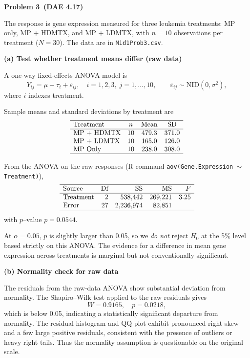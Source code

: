 \documentclass[answers,12pt,addpoints]{exam}
\begin{document}
\textbf{Problem 3 \,(DAE 4.17)}

The response is gene expression measured for three leukemia treatments:
MP only, MP + HDMTX, and MP + LDMTX, with $n=10$ observations per
treatment ($N=30$). The data are in \texttt{Mid1Prob3.csv}.

\medskip
\textbf{(a) Test whether treatment means differ (raw data)}

A one-way fixed-effects ANOVA model is
\[
Y_{ij} = \mu + \tau_i + \varepsilon_{ij},\quad
i=1,2,3,\; j=1,\dots,10,\qquad
\varepsilon_{ij} \sim \mathrm{NID}(0,\sigma^2),
\]
where $i$ indexes treatment.

Sample means and standard deviations by treatment are
\[
\begin{array}{lccc}
\hline
\text{Treatment} & n & \text{Mean} & \text{SD} \\
\hline
\text{MP + HDMTX} & 10 & 479.3 & 371.0 \\
\text{MP + LDMTX} & 10 & 165.0 & 126.0 \\
\text{MP Only}    & 10 & 238.0 & 308.0 \\
\hline
\end{array}
\]

From the ANOVA on the raw responses (R command
\texttt{aov(Gene.Expression $\sim$ Treatment)}),
\[
\begin{array}{lrrrr}
\hline
\text{Source} & \text{Df} & \text{SS} & \text{MS} & F \\
\hline
\text{Treatment} & 2 & 538{,}442 & 269{,}221 & 3.25 \\
\text{Error}     & 27 & 2{,}236{,}974 & 82{,}851 & \\
\hline
\end{array}
\]
with $p$–value $p = 0.0544$.

At $\alpha = 0.05$, $p$ is slightly larger than 0.05, so we \emph{do not}
reject $H_0$ at the 5\% level based strictly on this ANOVA. The evidence
for a difference in mean gene expression across treatments is marginal
but not conventionally significant.

\medskip
\textbf{(b) Normality check for raw data}

The residuals from the raw-data ANOVA show substantial deviation from
normality. The Shapiro–Wilk test applied to the raw residuals gives
\[
W = 0.9165,\quad p = 0.0218,
\]
which is below 0.05, indicating a statistically significant departure
from normality. The residual histogram and QQ plot 
exhibit pronounced right skew and a few large positive residuals,
consistent with the presence of outliers or heavy right tails. Thus the
normality assumption is questionable on the original scale.
\end{document}
